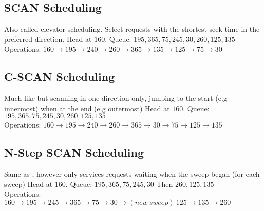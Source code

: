 \documentclass{report}
\begin{document}
\subsection*{SCAN Scheduling}
Also called elevator scheduling. Select requests with the shortest seek time in the preferred direction.
Head at $160$. Queue: $195, 365, 75, 245, 30, 260, 125, 135$
\\ Operations: $160 \to 195 \to 240 \to 260 \to 365 \to 135 \to 125 \to 75 \to 30$

\subsection*{C-SCAN Scheduling}
Much like  but scanning in one direction only, jumping to the start (e.g innermost) when at the end (e.g outermost)
Head at $160$. Queue: $195, 365, 75, 245, 30, 260, 125, 135$
\\ Operations: $160 \to 195 \to 240 \to 260 \to 365 \to 30 \to 75 \to 125 \to 135$

\subsection*{N-Step SCAN Scheduling}
Same as , however only services requests waiting when the sweep began (for each sweep)
Head at $160$. Queue: $195, 365, 75, 245, 30$ Then $260, 125, 135$
\\ Operations: $160 \to 195 \to 245 \to 365 \to 75 \to 30 \to (new \ sweep) \ 125 \to 135 \to 260$
\end{document}
